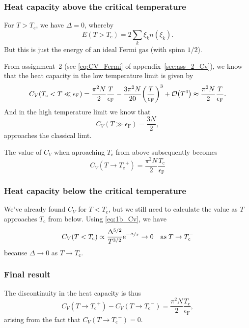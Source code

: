 \documentclass[11pt,letter, swedish, english
]{article}
\newcommand{\Tc}{\ensuremath{T_{\text{c}}}}
\newcommand{\eF}{\ensuremath{\epsilon_{\text{F}}}}
\begin{document}
\subsubsection{Heat capacity above the critical temperature}
For $T>\Tc$, we have $\Delta=0$, whereby
\begin{equation}
E(T>\Tc)=2\sum_k \xi_kn(\xi_k).
\end{equation}
But this is just the energy of an ideal Fermi gas (with spinn
$1/2$). 

From assignment~2 (see \eqref{eq:CV_Fermi} of
appendix~\ref{sec:ass_2_Cv}), we know that the heat capacity in the
low temperature limit is given by
\begin{equation}\label{eq:1c_Cv_Tc+}
C_V(\Tc<T\ll\eF)=\frac{\pi^2N}{2}\frac{T}{\eF}
-\frac{3\pi^2N}{20}\qty(\frac{T}{\eF})^3+\order{T^4}
\approx\frac{\pi^2N}{2}\frac{T}{\eF}.
\end{equation}
And in the high temperature limit we know that
\begin{equation}\label{eq:1c_Cv_T_high}
C_V(T\gg\eF)=\frac{3N}{2},
\end{equation}
approaches the classical limt.

The value of $C_V$ when aproaching $\Tc$ from above subsequently
becomes
\begin{equation}
C_V(T\to\Tc^+)=\frac{\pi^2N}{2}\frac{\Tc}{\eF}
\end{equation}

\subsubsection{Heat capacity below the critical temperature}
We've already found $C_V$ for $T<\Tc$, but we still need to calculate
the value as $T$ approaches $\Tc$ from below. Using \eqref{eq:1b_Cv},
we have
\begin{equation}\label{eq:1c_Cv->0}
C_V(T<\Tc)\propto
\frac{\Delta^{5/2}}{T^{3/2}}\ee^{-\nicefrac{\Delta}{T}}
\to 0 \quad
\text{as}\; T\to\Tc^-
\end{equation}
because $\Delta\to0$ as $T\to\Tc$.

\subsubsection{Final result}
The discontinuity in the heat capacity is thus
\begin{equation}
C_V(T\to\Tc^+)-C_V(T\to\Tc^-)=\frac{\pi^2N}{2}\frac{\Tc}{\eF},
\end{equation}
arising from the fact that $C_V(T\to\Tc^-)=0$.
\end{document}
